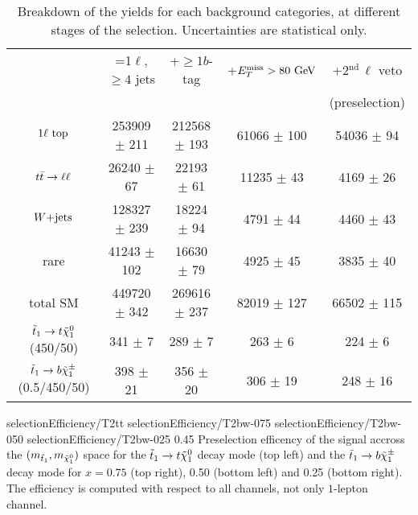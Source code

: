         \begin{table}[h!]
            \hspace*{-0.3cm}
            \begin{tabular}{|c|cccc|}
                \hline
                                             & =1$\ell$, $\geq 4$ jets   & +$\geq 1b$-tag     & +$E_T^\text{miss} > 80 ~\text{GeV}$ &  +2$^\text{nd}\, \ell$ veto \\
                                             &                           &                    &                   & (preselection) \\
                \hline
                $1\ell~\text{top}$              & 253909 $\pm$ 211          & 212568 $\pm$ 193   &  61066 $\pm$ 100  & 54036 $\pm$ 94     \\
                $t\bar{t} \rightarrow \ell \ell$               &  26240 $\pm$ 67           &  22193 $\pm$ 61    &  11235 $\pm$ 43   &  4169 $\pm$ 26     \\
                $\text{$W$+jets}$                     & 128327 $\pm$ 239          &  18224 $\pm$ 94    &   4791 $\pm$ 44   &  4460 $\pm$ 43     \\
                rare                         &  41243 $\pm$ 102          &  16630 $\pm$ 79    &   4925 $\pm$ 45   &  3835 $\pm$ 40     \\
                \hline
                total SM                     & 449720 $\pm$ 342          & 269616 $\pm$ 237   &  82019 $\pm$ 127  & 66502 $\pm$ 115    \\
                \hline
$\tilde{t}_1 \rightarrow t \tilde{\chi}_1^0$   (450/50) & 341 $\pm$ 7               & 289 $\pm$ 7        & 263 $\pm$ 6       & 224 $\pm$ 6        \\
$\tilde{t}_1 \rightarrow b \tilde{\chi}_1^\pm$ (0.5/450/50) & 398 $\pm$ 21              & 356 $\pm$ 20       & 306 $\pm$ 19      & 248 $\pm$ 16       \\
                \hline
            \end{tabular}
            \caption{Breakdown of the yields for each background categories, at different stages of the selection. Uncertainties are statistical only.}
            \label{tab:cutflowPreselection}
        \end{table}

                          {selectionEfficiency/T2tt}
                          {selectionEfficiency/T2bw-075}
                          {selectionEfficiency/T2bw-050}
                          {selectionEfficiency/T2bw-025}
                          {0.45}
                          {Preselection efficency of the signal accross the $(m_{\tilde{t}_1},
                          m_{\tilde{\chi}_1^0})$ space for the $\tilde{t}_1 \rightarrow t \tilde{\chi}_1^0$
                          decay mode (top left) and the $\tilde{t}_1 \rightarrow b \tilde{\chi}_1^\pm$
                          decay mode for $x = 0.75$ (top right), 0.50 (bottom left) and 0.25
                          (bottom right). The efficiency is computed with respect to all
                          channels, not only $1$-lepton channel.}


